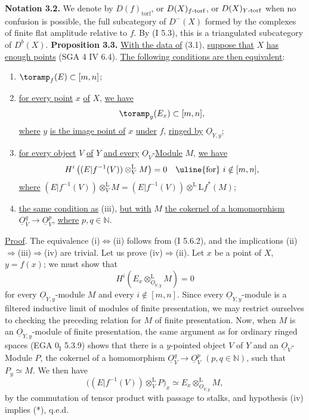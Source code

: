 \textbf{Notation 3.2.} We denote by \(D(f)_{\mathrm{torf}}\), or \(D(X)_{f\text{-}\mathrm{torf}}\), or \(D(X)_{Y\text{-}\mathrm{torf}}\) when no confusion is possible, the full subcategory of \(D^{-}(X)\) formed by the complexes of finite flat amplitude relative to \(f\). By (I 5.3), this is a triangulated subcategory of \(D^b(X)\).
%
\textbf{Proposition 3.3.} \uline{With the data of} (3.1), \uline{suppose that} \(X\) \uline{has enough points} (SGA 4 IV 6.4). \uline{The following conditions are then equivalent}:
\begin{enumerate}[label=(\roman*)]
\item \(\toramp_f(E)\subset[m,n]\);
\item \uline{for every point} \(x\) \uline{of} \(X\), \uline{we have}
\[
  \toramp_y(E_x)\subset[m,n],
\]
\uline{where} \(y\) \uline{is the image point of} \(x\) \uline{under} \(f\), \uline{ringed by} \(\underline{O}_{Y,y}\);
\item \uline{for every object} \(V\) \uline{of} \(Y\) \uline{and every} \(\underline{O}_V\)-\uline{Module} \(M\), \uline{we have}
\[
  H^i\left((E|f^{-1}(V))\otimes_V^{\mathrm L}M\right)=0
  \quad\text{\uline{for} }i\notin[m,n],
\]
\uline{where} \((E|f^{-1}(V))\otimes_V^{\mathrm L}M=(E|f^{-1}(V))\otimes^{\mathrm L}\mathrm Lf^*(M)\);
\item \uline{the same condition as} (iii), \uline{but with} \(M\) \uline{the cokernel of a homomorphism} \(\underline{O}_V^q\longrightarrow\underline{O}_V^p\), \uline{where} \(p,q\in\mathbb N\).
\end{enumerate}

\uline{Proof}. The equivalence (i)\(\Longleftrightarrow\)(ii) follows from (I 5.6.2), and the implications (ii)\(\Longrightarrow\)(iii)\(\Longrightarrow\)(iv) are trivial. Let us prove (iv)\(\Longrightarrow\)(ii). Let \(x\) be a point of \(X\), \(y=f(x)\); we must show that
\begin{equation}\tag{$*$}
  H^i(E_x\otimes_{\underline{O}_{Y,y}}^{\mathrm L}M)=0
\end{equation}
for every \(\underline{O}_{Y,y}\)-module \(M\) and every \(i\notin[m,n]\). Since every \(\underline{O}_{Y,y}\)-module is a filtered inductive limit of modules of finite presentation, we may restrict ourselves to checking the preceding relation for \(M\) of finite presentation. Now, when \(M\) is an \(\underline{O}_{Y,y}\)-module of finite presentation, the same argument as for ordinary ringed spaces (EGA \(0_{\mathrm I}\) 5.3.9) shows that there is a \(y\)-pointed object \(V\) of \(Y\) and an \(\underline{O}_V\)-Module \(P\), the cokernel of a homomorphism \(\underline{O}_V^q\longrightarrow\underline{O}_V^p\) \((p,q\in\mathbb N)\), such that \(P_y\simeq M\). We then have
\[
  \bigl((E|f^{-1}(V))\otimes_V^{\mathrm L}P\bigr)_x
  \simeq
  E_x\otimes_{\underline{O}_{Y,y}}^{\mathrm L}M,
\]
%
by the commutation of tensor product with passage to stalks, and hypothesis (iv) implies (*), q.e.d.

